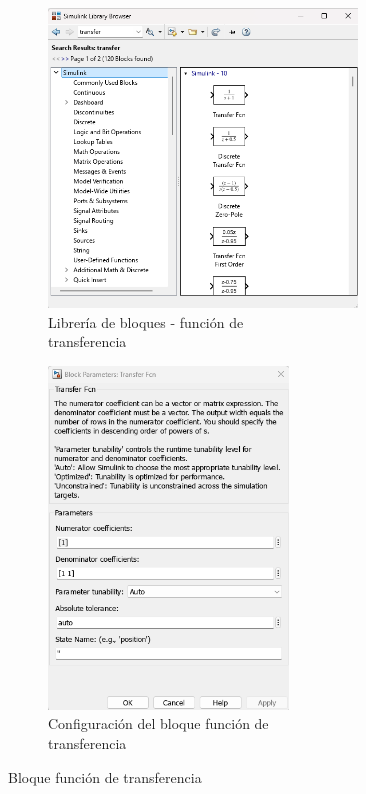 \begin{figure}[htbp]
    \centering
    \begin{subfigure}[b]{0.45\textwidth}
        \centering
        \includegraphics[width=0.9\textwidth]{fig/especifico_2/CASO_ESTUDIO_FILTRO/Transfer_func.png}
        \caption{Librería de bloques - función de \\ transferencia}
        \label{fig:lib_bloq_transfer_func}
    \end{subfigure}
    \hfill
    \begin{subfigure}[b]{0.45\textwidth}
        \centering
        \includegraphics[width=0.7\textwidth]{fig/especifico_2/CASO_ESTUDIO_FILTRO/Transfer_func_1.png}
        \caption{Configuración del bloque función de \\ transferencia}
        \label{fig:lib_bloq_transfer_func_conf}
    \end{subfigure}
    \caption{Bloque función de transferencia}
    \label{fig:lib_bloq_transfer_func_all}
\end{figure}

